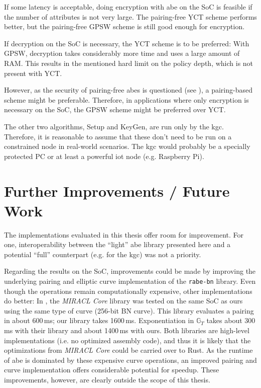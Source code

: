 If some latency is acceptable, doing encryption with \acrshort{abe} on the SoC is feasible if the number of attributes is not very large.
The pairing-free YCT scheme performs better, but the pairing-free GPSW scheme is still good enough for encryption.

If decryption on the SoC is necessary, the YCT scheme is to be preferred:
With GPSW, decryption takes considerably more time and uses a large amount of RAM.
This results in the mentioned hard limit on the policy depth, which is not present with YCT.

However, as the security of pairing-free \acrshort{abes} is questioned (see \cite{herranz_attacking_2020}), a pairing-based scheme might be preferable.
Therefore, in applications where only encryption is necessary on the SoC, the GPSW scheme might be preferred over YCT.

The other two algorithms, Setup and KeyGen, are run only by the \acrshort{kgc}.
Therefore, it is reasonable to assume that these don't need to be run on a constrained node in real-world scenarios.
The \acrshort{kgc} would probably be a specially protected PC or at least a powerful \acrshort{iot} node (e.g. Raspberry Pi).

\section{Further Improvements / Future Work}

The implementations evaluated in this thesis offer room for improvement.
For one, interoperability between the ``light'' \acrshort{abe} library presented here and a potential ``full'' counterpart (e.g. for the \acrshort{kgc}) was not a priority.

Regarding the results on the SoC, improvements could be made by improving the underlying pairing and elliptic curve implementation of the \texttt{rabe-bn} library.
Even though the operations remain computationally expensive, other implementations do better:
In \cite{scott_deployment_2020}, the \emph{MIRACL Core} library was tested on the same SoC as ours using the same type of curve (256-bit BN curve).
This library evaluates a pairing in about 600\,ms; our library takes 1600\,ms. 
Exponentiation in $\mathbb{G}_T$ takes about 300\,ms with their library and about 1400\,ms with ours. 
Both libraries are high-level implementations (i.e. no optimized assembly code), and thus it is likely that the optimizations from \emph{MIRACL Core} could be carried over to Rust.
As the runtime of \acrshort{abe} is dominated by these expensive curve operations, an improved pairing and curve implementation offers considerable potential for speedup.
These improvements, however, are clearly outside the scope of this thesis.

